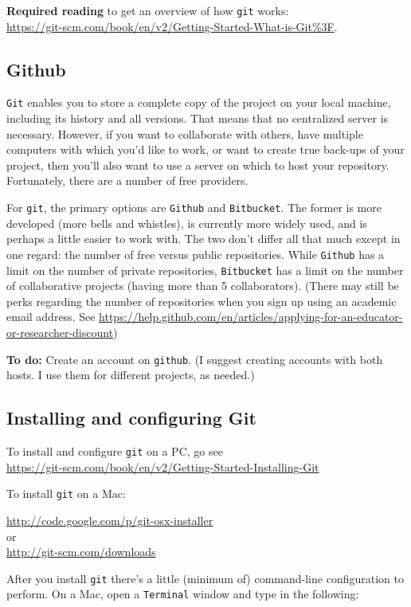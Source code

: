 \documentclass[12pt,letterpaper]{article}
\begin{document}
\textbf{Required reading} to get an overview of how \texttt{git} works:\\
\url{https://git-scm.com/book/en/v2/Getting-Started-What-is-Git%3F}.

\subsection{Github}
\texttt{Git} enables you to store a complete copy of the project on your local machine, including its history and all versions.  That means that no centralized server is necessary.  However, if you want to collaborate with others, have multiple computers with which you'd like to work, or want to create true back-ups of your project, then you'll also want to use a server on which to host your repository.  Fortunately, there are a number of free providers. 

For \texttt{git}, the primary options are \texttt{Github} and \texttt{Bitbucket}.  The former is more developed (more bells and whistles), is currently more widely used, and is perhaps a little easier to work with.  The two don't differ all that much except in one regard:  the number of free versus public repositories.  While \texttt{Github} has a limit on the number of private repositories, \texttt{Bitbucket} has a limit on the number of collaborative projects (having more than 5 collaborators).  (There may still be perks regarding the number of repositories when you sign up using an academic email address.  See \url{https://help.github.com/en/articles/applying-for-an-educator-or-researcher-discount})

\textbf{To do:} Create an account on \texttt{github}.  (I suggest creating accounts with both hosts.  I use them for different projects, as needed.)


\subsection{Installing and configuring Git}
To install and configure \texttt{git} on a PC, go see \\
\url{https://git-scm.com/book/en/v2/Getting-Started-Installing-Git}

To install \texttt{git} on a Mac:

\url{http://code.google.com/p/git-osx-installer}\\
or\\
\url{http://git-scm.com/downloads}


After you install \texttt{git} there's a little (minimum of) command-line configuration to perform.  On a Mac, open a \texttt{Terminal} window and type in the following:
\end{document}
